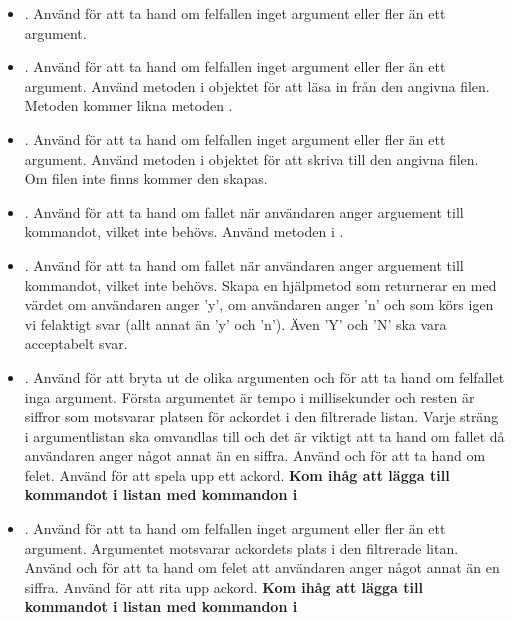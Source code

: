 {\begin{itemize}
\item {}. Använd  för att ta hand om felfallen inget argument eller fler än ett argument.

\item {}. Använd  för att ta hand om felfallen inget argument eller fler än ett argument. Använd metoden  i objektet  för att läsa in från den angivna filen. Metoden kommer likna metoden .

\item {}. Använd  för att ta hand om felfallen inget argument eller fler än ett argument. Använd metoden  i objektet  för att skriva till den angivna filen. Om filen inte finns kommer den skapas.

\item {}. Använd  för att ta hand om fallet när användaren anger arguement till kommandot, vilket inte behövs. Använd metoden i .

\item {}. Använd  för att ta hand om fallet när användaren anger arguement till kommandot, vilket inte behövs. Skapa en hjälpmetod  som returnerar en  med värdet  om användaren anger 'y',  om användaren anger 'n' och som körs igen vi felaktigt svar (allt annat än 'y' och 'n'). Även 'Y' och 'N' ska vara acceptabelt svar.

\item {}. Använd  för att bryta ut de olika argumenten och för att ta hand om felfallet inga argument. Första argumentet är tempo i millisekunder och resten är siffror som motsvarar platsen för ackordet i den filtrerade listan. Varje sträng i argumentlistan ska omvandlas till  och det är viktigt att ta hand om fallet då användaren anger något annat än en siffra. Använd  och  för att ta hand om felet. Använd  för att spela upp ett ackord. \textbf{Kom ihåg att lägga till kommandot i listan med kommandon i }

\item {}. Använd  för att ta hand om felfallen inget argument eller fler än ett argument. Argumentet motsvarar ackordets plats i den filtrerade litan. Använd  och  för att ta hand om felet att användaren anger något annat än en siffra. Använd  för att rita upp ackord. \textbf{Kom ihåg att lägga till kommandot i listan med kommandon i }
\end{itemize}

}
